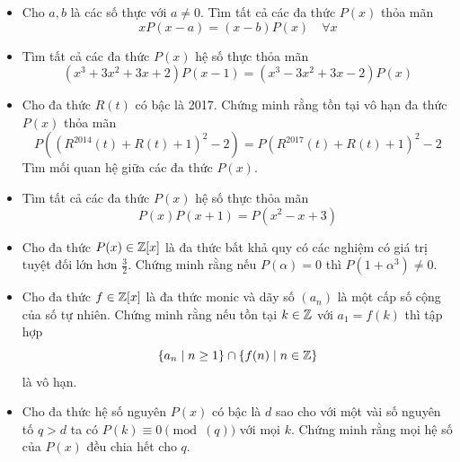 \documentclass[11pt]{scrartcl}
\begin{document}
\begin{itemize}[label=, leftmargin=0em, itemsep=-0em]
        \item \begin{btvn} Cho $a,b$ là các số thực với $a \neq 0$. Tìm tất cả các đa thức $P(x)$ thỏa mãn
            $$
            x P(x-a)=(x-b) P(x) \quad \forall x
            $$
        \end{btvn}

        \item \begin{btvn}
            Tìm tất cả các đa thức $P(x)$ hệ số thực thỏa mãn
            \[
                (x^3 + 3x^2 + 3x + 2)P(x - 1) = (x^3 - 3x^2 + 3x -2)P(x)
            \]
        \end{btvn}

        \item \begin{btvn}
            Cho đa thức $R(t)$ có bậc là 2017. Chứng minh rằng tồn tại vô hạn đa thức $P(x)$ thỏa mãn
            \[
                P((R^{2014}(t) + R(t) + 1)^2 - 2) = P(R^{2017}(t) + R(t) + 1)^2 - 2
            \]
            Tìm mối quan hệ giữa các đa thức $P(x)$.
        \end{btvn}

        \item \begin{btvn}
            Tìm tất cả các đa thức $P(x)$ hệ số thực thỏa mãn
            \[
                P(x)P(x + 1) = P(x^2 - x + 3)
            \]
        \end{btvn}

        \item \begin{btvn}
            Cho đa thức $P(x) \in \mathbb{Z}[x]$ là đa thức bất khả quy có các nghiệm có giá trị tuyệt đối lớn hơn $\frac{3}{2}$. Chứng minh rằng nếu $P(\alpha) = 0$ thì $P(1 + \alpha^3) \neq 0$.
        \end{btvn}
        \item \begin{btvn}
            Cho đa thức $f \in \mathbb{Z}[x]$ là đa thức monic và dãy số $(a_n)$ là một cấp số cộng của số tự nhiên. Chứng minh rằng nếu tồn tại $k \in \mathbb{Z}$ với $a_1 = f(k)$ thì tập hợp
            \[
                \{a_n \mid n \geq 1\} \cap \{f(n) \mid n \in \mathbb{Z}\}
            \]
            là vô hạn.
        \end{btvn}

        \item \begin{btvn}
            Cho đa thức hệ số nguyên $P(x)$ có bậc là $d$ sao cho với một vài số nguyên tố $q > d$ ta có $P(k) \equiv 0 \pmod(q)$ với mọi $k$. Chứng minh rằng mọi hệ số của $P(x)$ đều chia hết cho $q$.
        \end{btvn}


\end{itemize}
\end{document}
